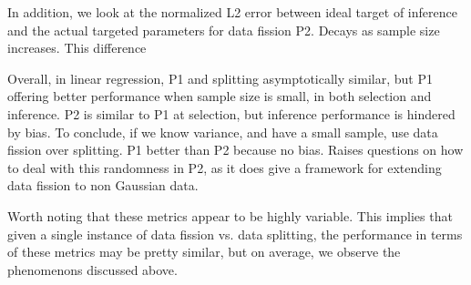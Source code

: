 In addition, we look at the normalized L2 error between ideal target of inference and the actual targeted parameters for data fission P2. Decays as sample size increases. This difference 

Overall, in linear regression, P1 and splitting asymptotically similar, but P1 offering better performance when sample size is small, in both selection and inference. P2 is similar to P1 at selection, but inference performance is hindered by bias. To conclude, if we know variance, and have a small sample, use data fission over splitting. P1 better than P2 because no bias. Raises questions on how to deal with this randomness in P2, as it does give a framework for extending data fission to non Gaussian data.

Worth noting that these metrics appear to be highly variable. This implies that given a single instance of data fission vs. data splitting, the performance in terms of these metrics may be pretty similar, but on average, we observe the phenomenons discussed above.

